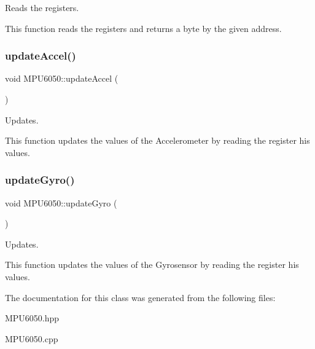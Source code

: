 Reads the registers. 

This function reads the registers and returns a byte by the given address. \mbox{\label{classMPU6050_a6b8c79ef52fecb044d2b45632ec8ae5b}} 
\subsubsection{\texorpdfstring{update\+Accel()}{updateAccel()}}
{\footnotesize\ttfamily void M\+P\+U6050\+::update\+Accel (\begin{DoxyParamCaption}{ }\end{DoxyParamCaption})}



Updates. 

This function updates the values of the Accelerometer by reading the register his values. \mbox{\label{classMPU6050_a306d02443c09814b573bd8597d1670c0}} 
\subsubsection{\texorpdfstring{update\+Gyro()}{updateGyro()}}
{\footnotesize\ttfamily void M\+P\+U6050\+::update\+Gyro (\begin{DoxyParamCaption}{ }\end{DoxyParamCaption})}



Updates. 

This function updates the values of the Gyrosensor by reading the register his values. 

The documentation for this class was generated from the following files\+:\begin{DoxyCompactItemize}
\item 
M\+P\+U6050.\+hpp\item 
M\+P\+U6050.\+cpp\end{DoxyCompactItemize}
